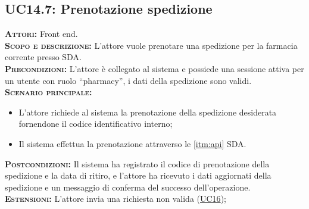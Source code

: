 \subsection{UC14.7: Prenotazione spedizione}
\label{sec:UC147}
\textsc{\textbf{Attori:}} Front end.\\
\textsc{\textbf{Scopo e descrizione:}} L'attore vuole prenotare una spedizione per la farmacia corrente presso SDA.\\
\textsc{\textsc{\textbf{Precondizioni:}}} L'attore è collegato al sistema e possiede una sessione attiva per un utente con ruolo ``pharmacy'', i dati della spedizione sono validi.\\
\textsc{\textbf{Scenario principale:}} 
\begin{itemize}
    \item L'attore richiede al sistema la prenotazione della spedizione desiderata fornendone il codice identificativo interno;
    \item Il sistema effettua la prenotazione attraverso le \ref{itm:api} SDA.
\end{itemize}
\textsc{\textbf{Postcondizioni:}} Il sistema ha registrato il codice di prenotazione della spedizione e la data di ritiro, e l'attore ha ricevuto i dati aggiornati della spedizione e un messaggio di conferma del successo dell'operazione.\\
\textsc{\textbf{Estensioni:}} L'attore invia una richiesta non valida (\hyperref[sec:UC16]{UC16});
